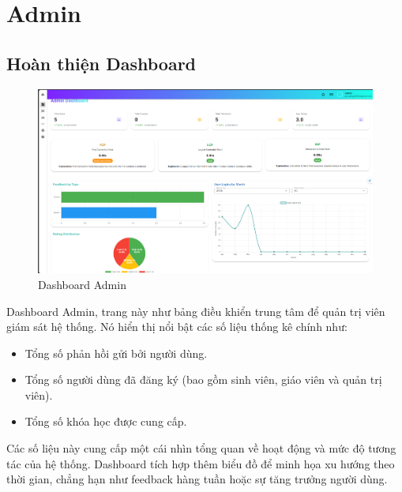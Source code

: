 \section{Admin}
\subsection{Hoàn thiện Dashboard}
\begin{figure}[H]
    \centering
    \includegraphics[width=0.8\linewidth]{images/admin_dashboard.png}
    \caption{Dashboard Admin}
    \label{fig:enter-label}
\end{figure}
Dashboard Admin, trang này như bảng điều khiển trung tâm để quản trị viên giám sát hệ thống. Nó hiển thị nổi bật các số liệu thống kê chính như:

\begin{itemize}
    \item Tổng số phản hồi gửi bởi người dùng.
    \item Tổng số người dùng đã đăng ký (bao gồm sinh viên, giáo viên và quản trị viên).
    \item Tổng số khóa học được cung cấp.
\end{itemize}

Các số liệu này cung cấp một cái nhìn tổng quan về hoạt động và mức độ tương tác của hệ thống. Dashboard tích hợp thêm biểu đồ để minh họa xu hướng theo thời gian, chẳng hạn như feedback hàng tuần hoặc sự tăng trưởng người dùng. 
